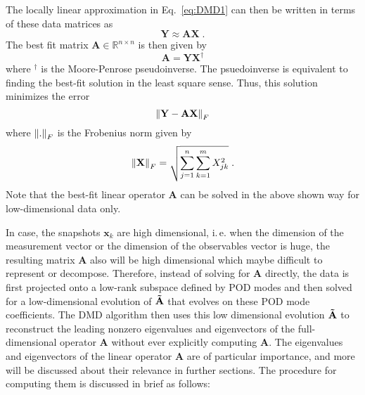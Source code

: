 \begin{itemize}
    The locally linear approximation in Eq.~\ref{eq:DMD1} can then be written in terms of these data matrices as
    \begin{equation}
        \mathbf{Y} \approx \mathbf{AX} \;.
    \end{equation}
    The best fit matrix $\mathbf{A} \in \mathbb{R}^{n\times n}$ is then given by
    \begin{equation}
        \mathbf{A} = \mathbf{YX^{\dagger}}
    \end{equation}
    where $^\dagger$  is the Moore-Penrose pseudoinverse. The psuedoinverse is equivalent to finding the best-fit solution in the least square sense. Thus, this solution minimizes the error
    \begin{equation}
        \left\lVert\mathbf{Y - AX}\right\rVert_F
    \end{equation}
    where $\left\lVert.\right\rVert_F$ is the Frobenius norm given by
    \begin{equation}
        \left\lVert\mathbf{X}\right\rVert_F = \sqrt{\sum_{j=1}^n\sum_{k=1}^mX_{jk}^2} \;.
    \end{equation}
     Note that the best-fit linear operator $\mathbf{A}$ can be solved in the above shown way for low-dimensional data only.
\end{itemize}
In case, the snapshots $\mathbf{x}_k$ are high dimensional, i.\,e. when the dimension of the measurement vector or the dimension of the observables vector is huge, the resulting matrix $\mathbf{A}$ also will be high dimensional which maybe difficult to represent or decompose. Therefore, instead of solving for $\mathbf{A}$ directly, the data is first projected onto a low-rank subspace defined by POD modes and then solved for a low-dimensional evolution of $\mathbf{\Tilde{A}}$ that evolves on these POD mode coefficients. The DMD algorithm then uses this low dimensional evolution $\mathbf{\Tilde{A}}$ to reconstruct the leading nonzero eigenvalues and eigenvectors of the full-dimensional operator $\mathbf{A}$ without ever explicitly computing $\mathbf{A}$. The eigenvalues and eigenvectors of the linear operator $\mathbf{A}$ are of particular importance, and more will be discussed about their relevance in further sections. The procedure for computing them is discussed in brief as follows:
